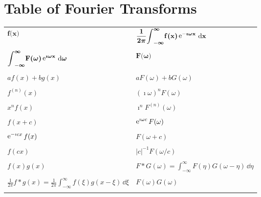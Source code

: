 \pagebreak
\section{Table of Fourier Transforms}

\setlongtables
\begin{longtable}{ll}
  $\displaystyle \mathbf{f  \boldsymbol{(} x \boldsymbol{)}}$
  & $\displaystyle \mathbf{\frac{1}{2 \boldsymbol{\pi}} 
    \boldsymbol{\int}_{-\boldsymbol{\infty}}^{\boldsymbol{\infty}} f \boldsymbol{(} x \boldsymbol{)}  
    \mathop{\mathrm{e}}\nolimits^{- \boldsymbol{\imath} \boldsymbol{\omega} x}\,\mathrm{d} x }$ \\
  \\
  $\displaystyle \mathbf{\boldsymbol{\int}_{-\boldsymbol{\infty}}^{\boldsymbol{\infty}} 
    F \boldsymbol{(} \boldsymbol{\omega} \boldsymbol{)} \mathop{\mathrm{e}}\nolimits^{\boldsymbol{\imath} \boldsymbol{\omega} x} \,\mathrm{d} \boldsymbol{\omega} }$
  & $\displaystyle \mathbf{ F \boldsymbol{(} \omega \boldsymbol{)}}$ \\
  \\
  $\displaystyle a f(x) + b g(x)$
  & $\displaystyle a F(\omega) + b G(\omega)$ \\
  \\
  $\displaystyle f^{(n)}(x)$
  & $\displaystyle (\imath \omega)^n F(\omega)$ \\
  \\
  $\displaystyle x^n f(x)$
  & $\displaystyle \imath^n F^{(n)}(\omega)$ \\
  \\
  $\displaystyle f(x + c)$
  & $\displaystyle \mathop{\mathrm{e}}\nolimits^{\imath \omega c} F(\omega)$ \\
  \\
  $\displaystyle \mathop{\mathrm{e}}\nolimits^{- \imath c x} f(x)$
  & $\displaystyle F(\omega + c)$ \\
  \\
  $\displaystyle f(c x)$
  & $\displaystyle |c|^{-1} F(\omega/c)$ \\
  \\
  $\displaystyle f(x) g(x)$
  & $\displaystyle F * G(\omega) = \int_{-\infty}^\infty F(\eta) G(\omega - \eta)\,\dd \eta$ \\
  \\
  $\displaystyle \frac{1}{2\pi} f * g(x) = \frac{1}{2 \pi} 
  \int_{-\infty}^\infty f(\xi)g(x - \xi)\,\dd \xi$
  & $\displaystyle F(\omega) G(\omega)$ \\
  \\

\end{longtable}
